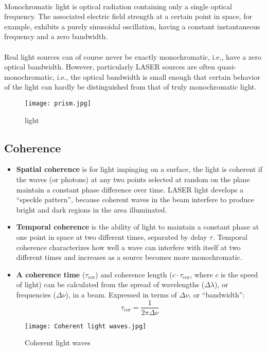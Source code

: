 \documentclass[a4paper,12pt]{article}
\begin{document}
\paragraph{}
Monochromatic light is optical radiation containing only a single optical frequency. The associated electric field strength at a certain point in space, for example, exhibits a purely sinusoidal oscillation, having a constant instantaneous frequency and a zero bandwidth. 
\paragraph{}
Real light sources can of course never be exactly monochromatic, i.e., have a zero optical bandwidth. However, particularly LASER sources are often quasi-monochromatic, i.e., the optical bandwidth is small enough that certain behavior of the light can hardly be distinguished from that of truly monochromatic light.
\begin{figure}[h!]
\centering
\texttt{[image: prism.jpg]}
\caption{light}
\label{fig:emission}
\end{figure}
 
\subsection{Coherence}
\begin{itemize}
     \item \textbf{Spatial coherence} is for light impinging on a surface, the light is coherent if the waves (or photons) at any two points selected at random on the plane maintain a constant phase difference over time. LASER light develops a “speckle pattern”, because coherent waves in the beam interfere to produce bright and dark regions in the area illuminated. 
     \item \textbf{Temporal coherence} is the ability of light to maintain a constant phase at one point in space at two different times, separated by delay $\tau_{\text{}}$. Temporal coherence characterizes how well a wave can interfere with itself at two different times and increases as a source becomes more monochromatic.
     \item \textbf{A coherence time} ($\tau_{\text{cor}}$) and coherence length ($c \cdot \tau_{\text{cor}}$, where $c$ is the speed of light) can be calculated from the spread of wavelengths ($\Delta \lambda $), or frequencies ($\Delta \nu$), in a beam. Expressed in terms of $\Delta \nu$, or “bandwidth”:
     $$\tau_{\text{cor}}=\frac{1}{2\pi\Delta \nu}$$
   \end{itemize}
\begin{figure}[h!]
\centering
\texttt{[image: Coherent light waves.jpg]}
\caption{Coherent light waves}
\label{fig:emission}
\end{figure}
 
\end{document}
